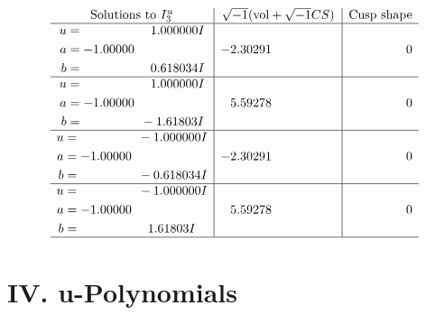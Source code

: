 \documentclass[1p]{elsarticle_modified}
\theoremstyle{definition}
\newcommand{\I}{\sqrt{-1}}
\begin{document}
$$\begin{array}{c|c|c}  
\text{Solutions to }I^u_{3}& \I (\text{vol} + \sqrt{-1}CS) & \text{Cusp shape}\\
 \hline 
\begin{aligned}
u &= \phantom{-0.000000 -}1.000000 I \\
a &= -1.00000\phantom{ +0.000000I} \\
b &= \phantom{-0.000000 -}0.618034 I\end{aligned}
 & -2.30291\phantom{ +0.000000I} & \phantom{-0.000000 } 0 \\ \hline\begin{aligned}
u &= \phantom{-0.000000 -}1.000000 I \\
a &= -1.00000\phantom{ +0.000000I} \\
b &= \phantom{-0.000000 } -1.61803 I\end{aligned}
 & \phantom{-}5.59278\phantom{ +0.000000I} & \phantom{-0.000000 } 0 \\ \hline\begin{aligned}
u &= \phantom{-0.000000 } -1.000000 I \\
a &= -1.00000\phantom{ +0.000000I} \\
b &= \phantom{-0.000000 } -0.618034 I\end{aligned}
 & -2.30291\phantom{ +0.000000I} & \phantom{-0.000000 } 0 \\ \hline\begin{aligned}
u &= \phantom{-0.000000 } -1.000000 I \\
a &= -1.00000\phantom{ +0.000000I} \\
b &= \phantom{-0.000000 -}1.61803 I\end{aligned}
 & \phantom{-}5.59278\phantom{ +0.000000I} & \phantom{-0.000000 } 0\\
 \hline 
 \end{array}$$\newpage
\newpage\renewcommand{\arraystretch}{1}
\centering \section*{ IV. u-Polynomials}
\end{document}

